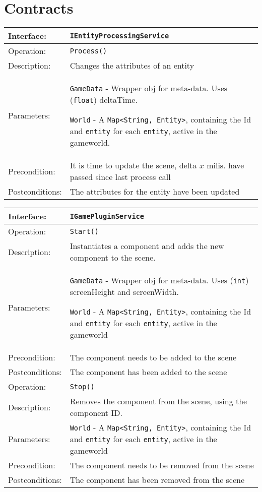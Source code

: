 \documentclass{article}
\begin{document}
	\section*{Contracts}
	\begin{tabularx}{\textwidth}{|l|X|}
		\hline Interface: & \texttt{IEntityProcessingService}\\\hline
		Operation: & \texttt{Process()}\\\hline
		Description: & Changes the attributes of an entity \\\hline
		Parameters: & \texttt{GameData} - Wrapper obj for meta-data. Uses (\texttt{float}) deltaTime.
		
		\texttt{World} - A \texttt{Map<String, Entity>}, containing the Id and \texttt{entity} for each \texttt{entity}, active in the gameworld.\\\hline
		Precondition: & It is time to update the scene, delta $x$ milis. have passed since last process call\\\hline
		Postconditions: & The attributes for the entity have been updated\\\hline
	\end{tabularx}
	
	\begin{tabularx}{\textwidth}{|l|X|}
		\hline Interface: & \texttt{IGamePluginService}\\\hline
		Operation: & \texttt{Start()}\\\hline
		Description: & Instantiates a component and adds the new component to the scene. \\\hline
		Parameters: & \texttt{GameData} - Wrapper obj for meta-data. Uses (\texttt{int})  screenHeight and screenWidth.
		
		\texttt{World} - A \texttt{Map<String, Entity>}, containing the Id and \texttt{entity} for each \texttt{entity}, active in the gameworld\\\hline
		Precondition: & The component needs to be added to the scene\\\hline
		Postconditions: & The component has been added to the scene\\\hline
		
		Operation: & \texttt{Stop()}\\\hline
		Description: & Removes the component from the scene, using the component ID. \\\hline
		Parameters: & \texttt{World} - A \texttt{Map<String, Entity>}, containing the Id and \texttt{entity} for each \texttt{entity}, active in the gameworld\\\hline
		Precondition: & The component needs to be removed from the scene\\\hline
		Postconditions: & The component has been removed from the scene\\\hline
	\end{tabularx}

	
\end{document}
